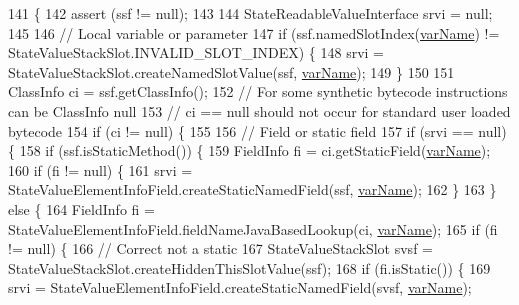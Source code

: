\begin{DoxyCode}
141                                                                                                    \{
142     assert (ssf != null);
143 
144     StateReadableValueInterface srvi = null;
145 
146     \textcolor{comment}{// Local variable or parameter}
147     \textcolor{keywordflow}{if} (ssf.namedSlotIndex(\hyperlink{classgov_1_1nasa_1_1jpf_1_1inspector_1_1server_1_1expression_1_1expressions_1_1_expression_state_value_name_a5861f8633f2b17e241b6c108a5671be3}{varName}) != StateValueStackSlot.INVALID\_SLOT\_INDEX) \{
148       srvi = StateValueStackSlot.createNamedSlotValue(ssf, \hyperlink{classgov_1_1nasa_1_1jpf_1_1inspector_1_1server_1_1expression_1_1expressions_1_1_expression_state_value_name_a5861f8633f2b17e241b6c108a5671be3}{varName});
149     \}
150 
151     ClassInfo ci = ssf.getClassInfo();
152     \textcolor{comment}{// For some synthetic bytecode instructions can be ClassInfo null}
153     \textcolor{comment}{// ci == null should not occur for standard user loaded bytecode}
154     \textcolor{keywordflow}{if} (ci != null) \{
155 
156       \textcolor{comment}{// Field or static field}
157       \textcolor{keywordflow}{if} (srvi == null) \{
158         \textcolor{keywordflow}{if} (ssf.isStaticMethod()) \{
159           FieldInfo fi = ci.getStaticField(\hyperlink{classgov_1_1nasa_1_1jpf_1_1inspector_1_1server_1_1expression_1_1expressions_1_1_expression_state_value_name_a5861f8633f2b17e241b6c108a5671be3}{varName});
160           \textcolor{keywordflow}{if} (fi != null) \{
161             srvi = StateValueElementInfoField.createStaticNamedField(ssf, 
      \hyperlink{classgov_1_1nasa_1_1jpf_1_1inspector_1_1server_1_1expression_1_1expressions_1_1_expression_state_value_name_a5861f8633f2b17e241b6c108a5671be3}{varName});
162           \}
163         \} \textcolor{keywordflow}{else} \{
164           FieldInfo fi = StateValueElementInfoField.fieldNameJavaBasedLookup(ci, 
      \hyperlink{classgov_1_1nasa_1_1jpf_1_1inspector_1_1server_1_1expression_1_1expressions_1_1_expression_state_value_name_a5861f8633f2b17e241b6c108a5671be3}{varName});
165           \textcolor{keywordflow}{if} (fi != null) \{
166             \textcolor{comment}{// Correct not a static}
167             StateValueStackSlot svsf = StateValueStackSlot.createHiddenThisSlotValue(ssf);
168             \textcolor{keywordflow}{if} (fi.isStatic()) \{
169               srvi = StateValueElementInfoField.createStaticNamedField(svsf, 
      \hyperlink{classgov_1_1nasa_1_1jpf_1_1inspector_1_1server_1_1expression_1_1expressions_1_1_expression_state_value_name_a5861f8633f2b17e241b6c108a5671be3}{varName});

\end{DoxyCode}
